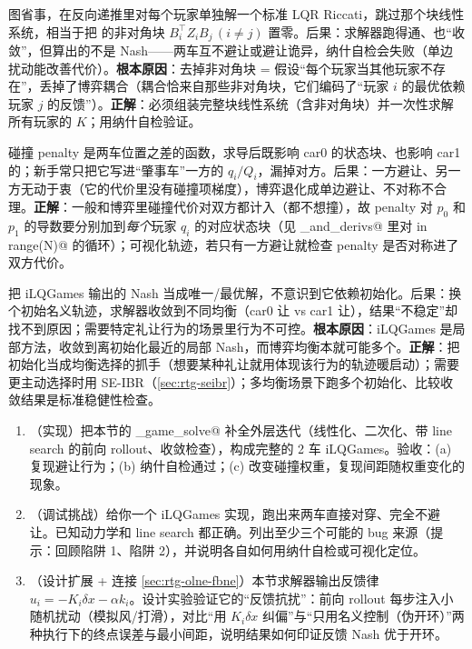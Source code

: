 \begin{pitfall}
图省事，在反向递推里对每个玩家单独解一个标准 LQR Riccati，跳过那个块线性系统，相当于把 \verb@M@ 的非对角块 $B_i^\top Z_iB_j\,(i\ne j)$ 置零。后果：求解器跑得通、也“收敛”，但算出的不是 Nash——两车互不避让或避让诡异，纳什自检会失败（单边扰动能改善代价）。\textbf{根本原因}：去掉非对角块 = 假设“每个玩家当其他玩家不存在”，丢掉了博弈耦合（耦合恰来自那些非对角块，它们编码了“玩家 $i$ 的最优依赖玩家 $j$ 的反馈”）。\textbf{正解}：必须组装完整块线性系统（含非对角块）并一次性求解所有玩家的 $K$；用纳什自检验证。
\end{pitfall}

\begin{pitfall}
碰撞 penalty 是两车位置之差的函数，求导后既影响 car0 的状态块、也影响 car1 的；新手常只把它写进“肇事车”一方的 $q_i/Q_i$，漏掉对方。后果：一方避让、另一方无动于衷（它的代价里没有碰撞项梯度），博弈退化成单边避让、不对称不合理。\textbf{正解}：一般和博弈里碰撞代价对双方都计入（都不想撞），故 penalty 对 $p_0$ 和 $p_1$ 的导数要分别加到\emph{每个}玩家 $q_i$ 的对应状态块（见 \verb@costs_and_derivs@ 里对 \verb@i in range(N)@ 的循环）；可视化轨迹，若只有一方避让就检查 penalty 是否对称进了双方代价。
\end{pitfall}

\begin{pitfall}
把 iLQGames 输出的 Nash 当成唯一/最优解，不意识到它依赖初始化。后果：换个初始名义轨迹，求解器收敛到不同均衡（car0 让 vs car1 让），结果“不稳定”却找不到原因；需要特定礼让行为的场景里行为不可控。\textbf{根本原因}：iLQGames 是局部方法，收敛到离初始化最近的局部 Nash，而博弈均衡本就可能多个。\textbf{正解}：把初始化当成均衡选择的抓手（想要某种礼让就用体现该行为的轨迹暖启动）；需要更主动选择时用 SE-IBR（\cref{sec:rtg-seibr}）；多均衡场景下跑多个初始化、比较收敛结果是标准稳健性检查。
\end{pitfall}

\begin{practice}
\begin{enumerate}
  \item （实现）把本节的 \verb@lq_game_solve@ 补全外层迭代（线性化、二次化、带 line search 的前向 rollout、收敛检查），构成完整的 2 车 iLQGames。验收：(a) 复现避让行为；(b) 纳什自检通过；(c) 改变碰撞权重，复现间距随权重变化的现象。
  \item （调试挑战）给你一个 iLQGames 实现，跑出来两车直接对穿、完全不避让。已知动力学和 line search 都正确。列出至少三个可能的 bug 来源（提示：回顾陷阱 1、陷阱 2），并说明各自如何用纳什自检或可视化定位。
  \item （设计扩展 + 连接 \cref{sec:rtg-olne-fbne}）本节求解器输出反馈律 $u_i=-K_i\delta x-\alpha k_i$。设计实验验证它的“反馈抗扰”：前向 rollout 每步注入小随机扰动（模拟风/打滑），对比“用 $K_i\delta x$ 纠偏”与“只用名义控制（伪开环）”两种执行下的终点误差与最小间距，说明结果如何印证反馈 Nash 优于开环。
\end{enumerate}
\end{practice}

